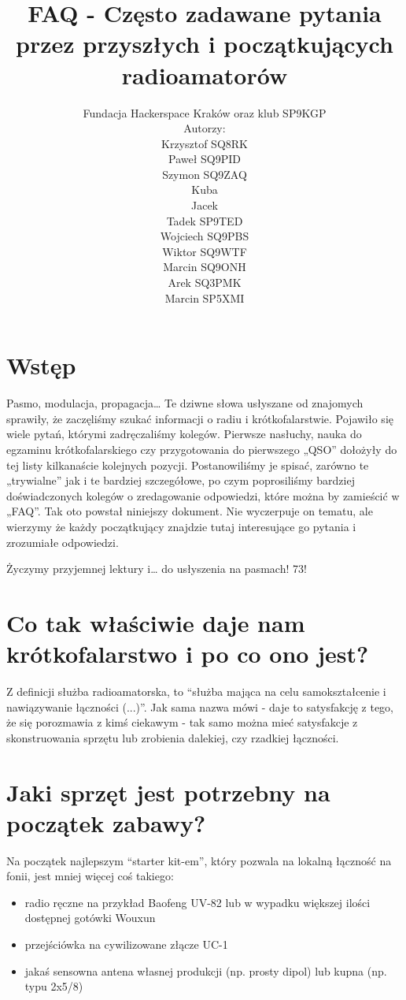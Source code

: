 \documentclass[a4paper,12pt]{article}
\title{\textbf{FAQ - Często zadawane pytania przez przyszłych i początkujących radioamatorów}}
\author{Fundacja Hackerspace Kraków
oraz klub SP9KGP\\
Autorzy:\\
Krzysztof SQ8RK\\
Paweł SQ9PID\\
Szymon SQ9ZAQ\\
Kuba\\
Jacek\\
Tadek SP9TED\\
Wojciech SQ9PBS\\
Wiktor SQ9WTF\\
Marcin SQ9ONH\\
Arek SQ3PMK\\
Marcin SP5XMI}
\begin{document}
\maketitle

\newpage
\newpage

\section{Wstęp}
Pasmo, modulacja, propagacja… Te dziwne słowa usłyszane od znajomych sprawiły, że zaczęliśmy szukać informacji o radiu i krótkofalarstwie. Pojawiło się wiele pytań, którymi zadręczaliśmy kolegów. Pierwsze nasłuchy, nauka do egzaminu krótkofalarskiego czy przygotowania do pierwszego „QSO” dołożyły do tej listy kilkanaście kolejnych pozycji. Postanowiliśmy je spisać, zarówno te „trywialne” jak i te bardziej szczegółowe, po czym poprosiliśmy bardziej doświadczonych kolegów o zredagowanie odpowiedzi, które można by zamieścić w „FAQ”. Tak oto powstał niniejszy dokument. Nie wyczerpuje on tematu, ale wierzymy że każdy początkujący znajdzie tutaj interesujące go pytania i zrozumiałe odpowiedzi. 

Życzymy przyjemnej lektury i… do usłyszenia na pasmach! 73!

\section{Co tak właściwie daje nam krótkofalarstwo i po co ono jest?}
Z definicji służba radioamatorska, to ``służba mająca na celu samokształcenie i nawiązywanie łączności (...)''. Jak sama nazwa mówi - daje to satysfakcję z tego, że się porozmawia z kimś ciekawym - tak samo można mieć satysfakcje z skonstruowania sprzętu lub zrobienia dalekiej, czy rzadkiej łączności.

\section{Jaki sprzęt jest potrzebny na początek zabawy?}
Na początek najlepszym “starter kit-em”, który pozwala na lokalną łączność na fonii, jest mniej więcej coś takiego:
\begin{itemize}
 \item radio ręczne na przykład Baofeng UV-82 lub w wypadku większej ilości dostępnej gotówki Wouxun
 \item przejściówka na cywilizowane złącze UC-1
 \item jakaś sensowna antena własnej produkcji (np. prosty dipol) lub kupna (np. typu 2x5/8)
\end{itemize}
\end{document}

